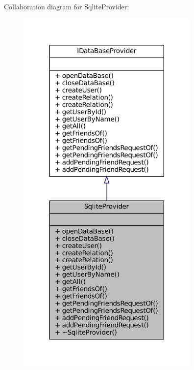 Collaboration diagram for Sqlite\+Provider\+:
\nopagebreak
\begin{figure}[H]
\begin{center}
\leavevmode
\includegraphics[width=255pt]{classSqliteProvider__coll__graph}
\end{center}
\end{figure}
